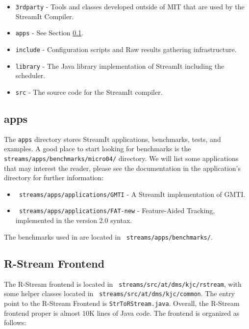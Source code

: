 \documentclass[10pt, letterpaper, onecolumn]{article}
\begin{document}
\begin{itemize}
\item {\tt 3rdparty} - Tools and classes developed outside of MIT that
  are used by the StreamIt Compiler.
\item {\tt apps} -  See Section \ref{apps}.
\item {\tt include} - Configuration scripts and Raw results gathering
  infrastructure.
\item {\tt library} - The Java library implementation of StreamIt
  including the scheduler. 
\item {\tt src} - The source code for the StreamIt compiler.
\end{itemize}

\subsection{apps}
\label{apps}
The {\tt apps} directory stores StreamIt applications,
benchmarks, tests, and examples.  A good place to start looking for
benchmarks is the {\tt streams/apps/benchmarks/micro04/} directory.
We will list some applications that may interest the reader, please
see the documentation in the application's directory for further
information:

\begin{itemize}
\item {\tt
streams/apps/applications/GMTI} - A
StreamIt implementation of GMTI.
\item {\tt
streams/apps/applications/FAT-new} -
Feature-Aided Tracking, implemented in the version 2.0 syntax.
\end{itemize}

The benchmarks used in \cite{streamit-asplos} are located in {\tt
streams/apps/benchmarks/}.

\subsection{R-Stream Frontend}
The R-Stream frontend is located in {\tt
streams/src/at/dms/kjc/rstream},
with some helper classes located in {\tt
streams/src/at/dms/kjc/common}.
The entry point to the R-Stream Frontend is {\tt StrToRStream.java}.
Overall, the R-Stream frontend proper is almost 10K lines of Java code.
The frontend is organized as follows:
\end{document}
